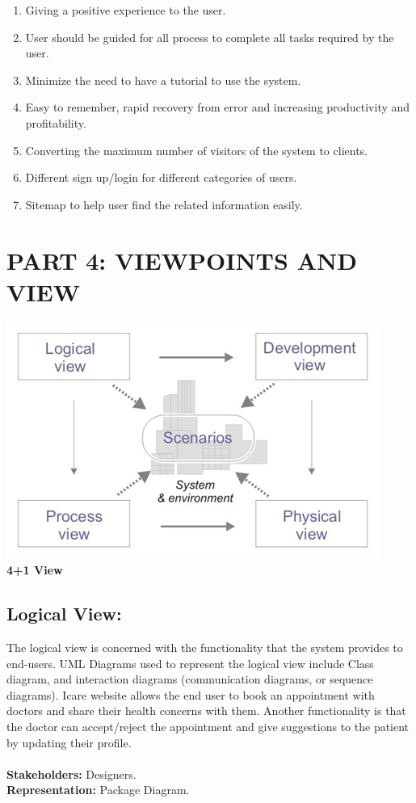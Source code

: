 \documentclass[a4paper,12pt]{report}
\begin{document}
\begin{enumerate}
\begin{enumerate}
            \item Giving a positive experience to the user.
            \item User should be guided for all process to complete all tasks required by the user.
            \item Minimize the need to have a tutorial to use the system.
            \item Easy to remember, rapid recovery from error and increasing productivity and profitability.
            \item Converting the maximum number of visitors of the system to clients.
            \item Different sign up/login for different categories of users.
            \item Sitemap to help user find the related information easily.
        \end{enumerate}
\end{enumerate}

\chapter*{PART 4: VIEWPOINTS AND VIEW}

\begin{center}
    \includegraphics{UML/4view.png}\\
    \textbf{4+1 View}
\end{center}

\section*{Logical View:}
The logical view is concerned with the functionality that the system provides to end-users. UML Diagrams used to represent the logical view include Class diagram, and interaction diagrams (communication diagrams, or sequence diagrams). Icare website allows the end user to book an appointment with doctors and share their health concerns with them. Another functionality is that the doctor can accept/reject the appointment and give suggestions to the patient by updating their profile.\\\\
\textbf{Stakeholders:} Designers.\\ 
\textbf{Representation:} Package Diagram.
\end{document}
